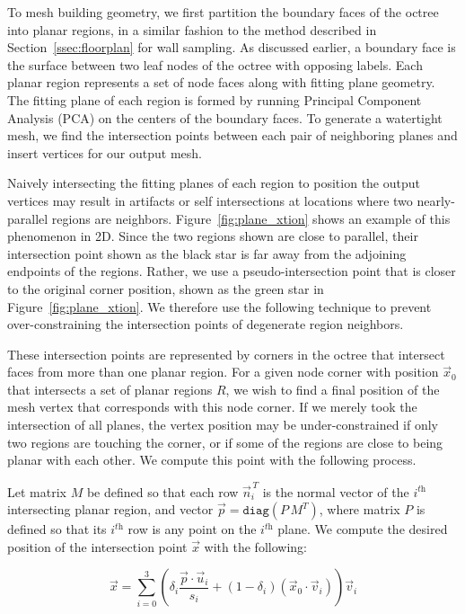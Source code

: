 \documentclass[review]{acmsiggraph}
\begin{document}
To mesh building geometry, we first partition the boundary faces of the octree into planar regions, in a similar fashion to the method described in Section~\ref{ssec:floorplan} for wall sampling.  As discussed earlier, a boundary face is the surface between two leaf nodes of the octree with opposing labels.  Each planar region represents a set of node faces along with fitting plane geometry.  The fitting plane of each region is formed by running Principal Component Analysis (PCA) on the centers of the boundary faces.  To generate a watertight mesh, we find the intersection points between each pair of neighboring planes and insert vertices for our output mesh.  

Naively intersecting the fitting planes of each region to position the output vertices may result in artifacts or self intersections at locations where two nearly-parallel regions are neighbors.  Figure~\ref{fig:plane_xtion} shows an example of this phenomenon in 2D.  Since the two regions shown are close to parallel, their intersection point shown as the black star is far away from the adjoining endpoints of the regions.  Rather, we use a pseudo-intersection point that is closer to the original corner position, shown as the green star in Figure~\ref{fig:plane_xtion}.  We therefore use the following technique to prevent over-constraining the intersection points of degenerate region neighbors.

These intersection points are represented by corners in the octree that intersect faces from more than one planar region.  For a given node corner with position $\vec{x}_0$ that intersects a set of planar regions $R$, we wish to find a final position of the mesh vertex that corresponds with this node corner.  If we merely took the intersection of all planes, the vertex position may be under-constrained if only two regions are touching the corner, or if some of the regions are close to being planar with each other.  
We compute this point with the following process.

Let matrix $M$ be defined so that each row $\vec{n}_i^{\,T}$ is the normal vector of the $i^{\textit{th}}$ intersecting planar region, and vector $\vec{p} = \texttt{diag}(P\,M^T)$, where matrix $P$ is defined so that its $i^{\textit{th}}$ row is any point on the $i^{\textit{th}}$ plane.  We compute the desired position of the intersection point $\vec{x}$ with the following:

\begin{equation}
	\vec{x} = \sum_{i = 0}^{3} \left( \delta_i \dfrac{\vec{p} \cdot \vec{u}_i}{s_i} + (1-\delta_i) ( \vec{x}_0 \cdot \vec{v}_i ) \right) \vec{v}_i
	\label{eq:plane_xtion}
\end{equation}
\end{document}
